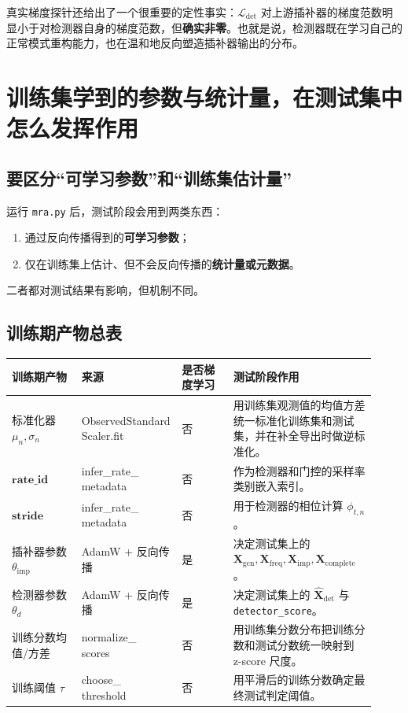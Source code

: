 \documentclass[UTF8]{ctexart}
\newcommand{\codecell}[1]{\parbox[t]{\linewidth}{\raggedright\ttfamily\small #1}}
\begin{document}
真实梯度探针还给出了一个很重要的定性事实：\(\mathcal{L}_{\text{det}}\) 对上游插补器的梯度范数明显小于对检测器自身的梯度范数，但\textbf{确实非零}。也就是说，检测器既在学习自己的正常模式重构能力，也在温和地反向塑造插补器输出的分布。

\section{训练集学到的参数与统计量，在测试集中怎么发挥作用}

\subsection{要区分“可学习参数”和“训练集估计量”}

运行 \texttt{mra.py} 后，测试阶段会用到两类东西：
\begin{enumerate}
    \item 通过反向传播得到的\textbf{可学习参数}；
    \item 仅在训练集上估计、但不会反向传播的\textbf{统计量或元数据}。
\end{enumerate}

二者都对测试结果有影响，但机制不同。

\subsection{训练期产物总表}

{\small
\setlength{\tabcolsep}{4pt}
\begin{longtable}{@{}>{\raggedright\arraybackslash}p{0.19\linewidth} >{\raggedright\arraybackslash}p{0.20\linewidth} >{\raggedright\arraybackslash}p{0.14\linewidth} >{\raggedright\arraybackslash}p{0.39\linewidth}@{}}
\toprule
训练期产物 & 来源 & 是否梯度学习 & 测试阶段作用 \\
\midrule
\endhead
标准化器 \(\mu_n,\sigma_n\) & \codecell{ObservedStandard\\Scaler.fit} & 否 & 用训练集观测值的均值方差统一标准化训练集和测试集，并在补全导出时做逆标准化。 \\
\(\bm{rate\_id}\) & \codecell{infer\_rate\_\\metadata} & 否 & 作为检测器和门控的采样率类别嵌入索引。 \\
\(\bm{stride}\) & \codecell{infer\_rate\_\\metadata} & 否 & 用于检测器的相位计算 \(\phi_{t,n}\)。 \\
插补器参数 \(\theta_{\text{imp}}\) & AdamW + 反向传播 & 是 & 决定测试集上的 \(\bm{X}_{\text{gcn}}, \bm{X}_{\text{freq}}, \bm{X}_{\text{imp}}, \bm{X}_{\text{complete}}\)。 \\
检测器参数 \(\theta_d\) & AdamW + 反向传播 & 是 & 决定测试集上的 \(\widehat{\bm{X}}_{\text{det}}\) 与 \texttt{detector\_score}。 \\
训练分数均值/方差 & \codecell{normalize\_\\scores} & 否 & 用训练集分数分布把训练分数和测试分数统一映射到 z-score 尺度。 \\
训练阈值 \(\tau\) & \codecell{choose\_\\threshold} & 否 & 用平滑后的训练分数确定最终测试判定阈值。 \\
\bottomrule
\end{longtable}
}
\end{document}
